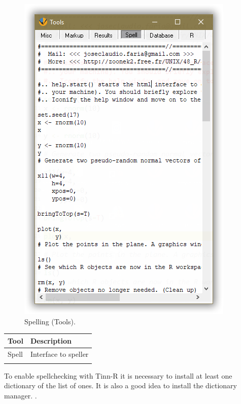 \begin{figure}[H]
  \includegraphics[scale=0.35]{./res/tools_spell.png}
  \caption{Spelling (Tools).}
  \label{fig:tools_spell}
\end{figure}

\begin{footnotesize}
  \begin{tabularx}{\textwidth}{>{\hsize=0.3\hsize}X>{\hsize=0.7\hsize}X}\\
    \hline
    \textbf{Tool} & \textbf{Description} \\
    \hline
    Spell & Interface to speller \\
    \hline
    \\
  \end{tabularx}
\end{footnotesize}

To enable spellchecking with Tinn-R it is necessary to install at
least one dictionary of the list of
 ones.
It is also a good idea to install the dictionary manager.
.


